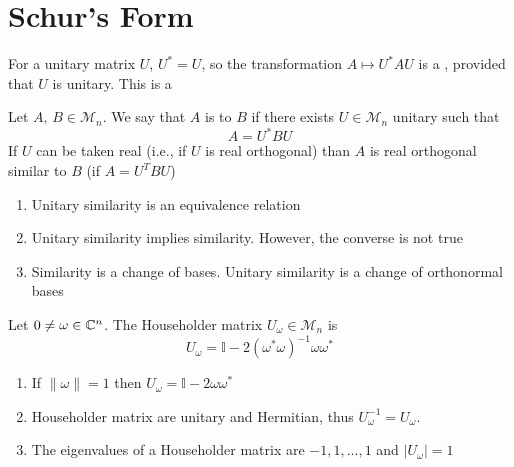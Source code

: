 \documentclass[aspectratio=169]{beamer}
\begin{document}
\section{Schur's Form }


\begin{frame}
For a unitary matrix $U$, $U^*=U$, so the transformation $A\mapsto U^*AU$ is a , provided that $U$ is unitary. This is a 
\vfill
\begin{definition}
Let $A,\, B\in \mathcal{M}_n$. We say that $A$ is  to $B$ if there exists $U\in \mathcal{M}_n$ unitary such that 
\[
	A=U^*BU
\]
If $U$ can be taken real (i.e., if $U$ is real orthogonal) than $A$ is real orthogonal similar to $B$ (if $A=U^TBU$)
\end{definition}
\end{frame}


\begin{frame}
\begin{remark}
\begin{enumerate}
    \item Unitary similarity is an equivalence relation
    \item Unitary similarity implies similarity. However, the converse is not true
    \item Similarity is a change of bases. Unitary similarity is a change of orthonormal bases
\end{enumerate}
\end{remark}
\vfill
\begin{definition} Let $0 \neq \omega \in \mathbb{C}^n$. The Householder matrix $U_{\omega}\in \mathcal{M}_n$ is 
\[
    U_{\omega}= \mathbb{I}-2(\omega^* \omega)^{-1} \omega \omega^*
\]
\end{definition}
\end{frame}

\begin{frame}
\begin{remark}
\begin{enumerate}
    \item If $\| \omega \|=1$ then $U_{\omega} = \mathbb{I}-2\omega\omega^*$
    \item Householder matrix are unitary and Hermitian, thus $U_{\omega}^{-1}= U_{\omega}$.
    \item The eigenvalues of a Householder matrix are $-1, 1, \ldots, 1$ and $| U_{\omega}|=1$
\end{enumerate}
\end{remark}
\end{frame}
\end{document}
